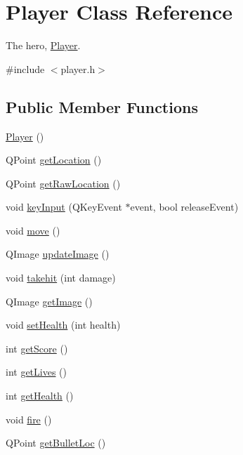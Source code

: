 \hypertarget{classPlayer}{
\section{Player Class Reference}
\label{classPlayer}
}


The hero, \hyperlink{classPlayer}{Player}.  




{\ttfamily \#include $<$player.h$>$}

\subsection*{Public Member Functions}
\begin{DoxyCompactItemize}
\item 
\hyperlink{classPlayer_affe0cc3cb714f6deb4e62f0c0d3f1fd8}{Player} ()
\item 
QPoint \hyperlink{classPlayer_a169bb834e15591c3c133d4bbee3aeb0a}{getLocation} ()
\item 
QPoint \hyperlink{classPlayer_adc4c9f02a1df8f3a75aafe9559063319}{getRawLocation} ()
\item 
void \hyperlink{classPlayer_a80696766994dfa4bb97beb6d3137e7f9}{keyInput} (QKeyEvent $\ast$event, bool releaseEvent)
\item 
void \hyperlink{classPlayer_ae02ee46d8c20dd0697b975f935b09839}{move} ()
\item 
QImage \hyperlink{classPlayer_ad244f6175a53a1bdefbaccf2ed67fa52}{updateImage} ()
\item 
void \hyperlink{classPlayer_a578351347b14a01a5f45dcde9bb0e1a2}{takehit} (int damage)
\item 
QImage \hyperlink{classPlayer_a353a2656c396c1623789b54a32148424}{getImage} ()
\item 
void \hyperlink{classPlayer_a8f28f6b069f7388877e02ae0a175d4ab}{setHealth} (int health)
\item 
int \hyperlink{classPlayer_a97e5447778ae6c384eedc532dcd8431d}{getScore} ()
\item 
int \hyperlink{classPlayer_af56ac33b9b2ebd9f97c8a6f485cf2d47}{getLives} ()
\item 
int \hyperlink{classPlayer_abcb15d249bed9a4ab0ab86b52b0d747a}{getHealth} ()
\item 
void \hyperlink{classPlayer_a5dc98bda088b0e253956ef22eba154f0}{fire} ()
\item 
QPoint \hyperlink{classPlayer_a0f84ae7f267cb0785a1cb947fa245c1e}{getBulletLoc} ()
\item 

\end{DoxyCompactItemize}

